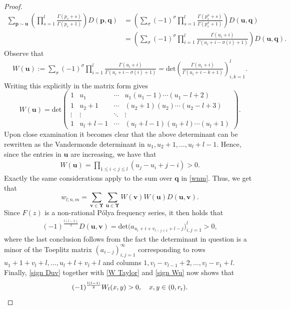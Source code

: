 \documentclass[twoside,a4paper]{amsart}
\renewcommand{\det}{\mathrm{det}}
\theoremstyle{remark}
\begin{document}
\begin{proof}
\begin{align}
\sum_{\boldsymbol p\sim \boldsymbol u} \left(\prod_{s=1}^l\frac{\Gamma(p_s+s)}{\Gamma(p_s+1)}\right)D(\boldsymbol p,\boldsymbol q)& = \left(\sum_\sigma (-1)^\sigma \prod_{s=1}^l\frac{\Gamma(p_s^\sigma+s)}{\Gamma(p_s^\sigma+1)}\right) D(\boldsymbol u,\boldsymbol q) \\
& = \left(\sum_\sigma (-1)^\sigma \prod_{i=1}^l \frac{\Gamma(u_i+i)}{\Gamma(u_i+i-\sigma(i)+1)}\right) D(\boldsymbol u,\boldsymbol q).
\end{align}
Observe that
\begin{eqnarray*}
W(\boldsymbol u) := 
\sum_\sigma (-1)^\sigma \prod_{i=1}^l \frac{\Gamma(u_i+i)}{\Gamma(u_i+i-\sigma(i)+1)} =
\det\left( \frac{\Gamma(u_i+i)}{\Gamma(u_i+i-k+1)} \right)_{i,k=1}^l.
\end{eqnarray*}
Writing this explicitly in the matrix form gives
\[
W(\boldsymbol u) = \det\begin{pmatrix}
1 & u_1 & \cdots & u_1(u_1-1)\cdots(u_1-l+2) \\
1 & u_2+1 & \cdots & (u_2+1)(u_2)\cdots(u_2-l+3) \\
\vdots & \vdots & \ddots & \vdots \\
1 & u_l+l-1 & \cdots & (u_l+l-1)(u_l+l)\cdots(u_l+1)
\end{pmatrix}.
\]
Upon close examination it becomes clear that the above determinant can be rewritten as the Vandermonde determinant in \( u_1,u_2+1,\ldots,u_l+l-1 \). Hence, since the entries in $\boldsymbol u$ are increasing, we have that
\begin{align}
\label{sign Wu}
W(\boldsymbol u) = \prod_{1\leq i<j\leq l} (u_j-u_i+j-i)>0.
\end{align}
Exactly the same considerations apply to the sum over \( \boldsymbol q \) in \eqref{wnm}. Thus, we get that
\[
w_{l;n,m} = \sum_{\boldsymbol v\in \boldsymbol\Upsilon}\sum_{\boldsymbol u\in \boldsymbol\Upsilon} W(\boldsymbol v)W(\boldsymbol u) D(\boldsymbol u,\boldsymbol v).
\]
Since \( F(z) \) is a non-rational P\'olya frequency series, it then holds that
\begin{align}
\label{sign Duv}
(-1)^{\frac{l(l-1)}{2}}D(\boldsymbol u,\boldsymbol v) = \det\big( a_{u_i+i+v_{l-j+1}+l-j} \big)_{i,j=1}^l>0,
\end{align}
where the last conclusion follows from the fact the determinant in question is a minor of the Toeplitz matrix \( (a_{i-j})_{i,j=1}^\infty \) corresponding to rows \( u_1+1+v_l+l,\ldots,u_l+l+v_l+l\) and columns \( 1,v_l-v_{l-1}+2,\ldots,v_l-v_1+l\). Finally, \eqref{sign Duv} together with \eqref{W Taylor} and \eqref{sign Wu} now shows that 
\[
(-1)^{\frac{l(l-1)}{2}} W_l(x,y)>0,  \quad x,y\in(0,r_{\mathrm r}). \qedhere
\]
\end{proof}
\end{document}
